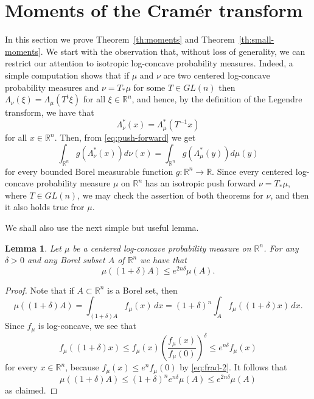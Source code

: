 \documentclass[11pt,leqno]{article}
\newtheorem{lemma}[theorem]{Lemma}
\theoremstyle{definition}
\theoremstyle{remark}
\numberwithin{equation}{section}
\newcommand{\ls}{\leqslant}
\newcommand{\1}{\textbf{1}}
\begin{document}
\section{Moments of the Cram\'{e}r transform}\label{section-3}

In this section we prove Theorem~\ref{th:moments} and Theorem~\ref{th:small-moments}. We start with the observation that,
without loss of generality, we can restrict our attention to isotropic log-concave probability measures. Indeed, a simple computation
shows that if $\mu$ and $\nu$ are two centered log-concave probability measures and $\nu =T_{\ast}\mu$ for some $T\in GL(n)$
then $\Lambda_{\nu}(\xi)=\Lambda_{\mu}(T^t\xi)$ for all $\xi\in\mathbb{R}^n$, and hence, by the definition of the
Legendre transform, we have that
$$\Lambda_{\nu}^{\ast}(x)=\Lambda_{\mu}^{\ast}(T^{-1}x)$$
for all $x\in\mathbb{R}^n$. Then, from \eqref{eq:push-forward} we get
\begin{equation}\label{eq:push-forward-2}\int_{{\mathbb R}^n}g(\Lambda_{\nu}^{\ast}(x))d\nu (x)=\int_{{\mathbb R}^n}g(\Lambda_{\mu}^{\ast}(y))d\mu (y)\end{equation}
for every bounded Borel measurable function $g:{\mathbb R}^n\to {\mathbb R}$. Since every centered log-concave
probability measure $\mu$ on $\mathbb{R}^n$ has an isotropic push forward $\nu=T_{\ast}\mu$, where $T\in GL(n)$,
we may check the assertion of both theorems for $\nu$, and then it also holds true fror $\mu$.

We shall also use the next simple but useful lemma.

\begin{lemma}\label{lem:2}Let $\mu$ be a centered log-concave probability measure on ${\mathbb R}^n$. For
any $\delta>0$ and any Borel subset $A$ of $\mathbb{R}^n$ we have that
$$\mu((1+\delta)A)\ls e^{2n\delta }\mu(A).$$
\end{lemma}

\begin{proof}Note that if $A\subset {\mathbb R}^n$ is a Borel set, then
$$\mu((1+\delta)A)=\int_{(1+\delta)A}f_{\mu}(x)\,dx=(1+\delta)^n\int_Af_{\mu}((1+\delta)x)\,dx.$$
Since $f_{\mu}$ is log-concave, we see that
$$f_{\mu}((1+\delta)x)\ls f_{\mu}(x)\left(\frac{f_{\mu}(x)}{f_{\mu}(0)}\right)^{\delta}\ls e^{n\delta}f_{\mu}(x)$$
for every $x\in {\mathbb R}^n$, because $f_{\mu}(x)\ls e^nf_{\mu}(0)$ by \eqref{eq:frad-2}. It follows that
\begin{equation*}\mu((1+\delta)A)\ls (1+\delta)^ne^{n\delta}\mu(A)\ls e^{2n\delta}\mu(A)\end{equation*}
as claimed. \end{proof}
\end{document}
